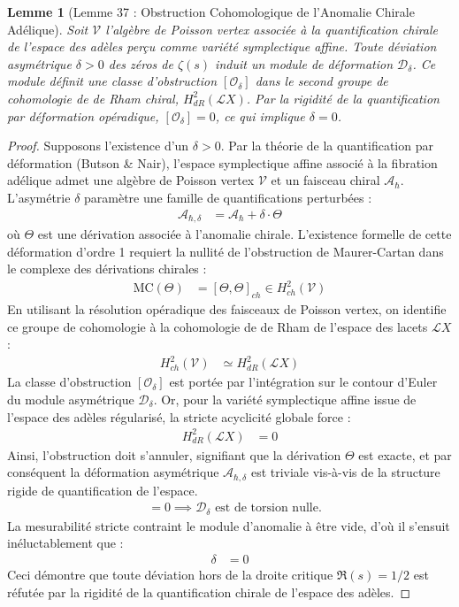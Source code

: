 \documentclass[
]{article}
\newtheorem{lemma}{Lemme}
\begin{document}
\begin{lemma}[Lemme 37 : Obstruction Cohomologique de l'Anomalie Chirale Adélique]
Soit $\mathcal{V}$ l'algèbre de Poisson vertex associée à la quantification chirale de l'espace des adèles perçu comme variété symplectique affine. Toute déviation asymétrique $\delta > 0$ des zéros de $\zeta(s)$ induit un module de déformation $\mathcal{D}_\delta$. Ce module définit une classe d'obstruction $[\mathcal{O}_\delta]$ dans le second groupe de cohomologie de de Rham chiral, $H^2_{dR}(\mathcal{L}X)$. Par la rigidité de la quantification par déformation opéradique, $[\mathcal{O}_\delta] = 0$, ce qui implique $\delta = 0$.
\end{lemma}

\begin{proof}
Supposons l'existence d'un $\delta > 0$. Par la théorie de la quantification par déformation (Butson \& Nair), l'espace symplectique affine associé à la fibration adélique admet une algèbre de Poisson vertex $\mathcal{V}$ et un faisceau chiral $\mathcal{A}_{\hbar}$.
L'asymétrie $\delta$ paramètre une famille de quantifications perturbées :
\begin{align*}
\mathcal{A}_{\hbar,\delta} &= \mathcal{A}_{\hbar} + \delta \cdot \Theta
\end{align*}
où $\Theta$ est une dérivation associée à l'anomalie chirale.
L'existence formelle de cette déformation d'ordre 1 requiert la nullité de l'obstruction de Maurer-Cartan dans le complexe des dérivations chirales :
\begin{align*}
\mathrm{MC}(\Theta) &= [\Theta, \Theta]_{ch} \in H^2_{ch}(\mathcal{V})
\end{align*}
En utilisant la résolution opéradique des faisceaux de Poisson vertex, on identifie ce groupe de cohomologie à la cohomologie de de Rham de l'espace des lacets $\mathcal{L}X$ :
\begin{align*}
H^2_{ch}(\mathcal{V}) &\simeq H^2_{dR}(\mathcal{L}X)
\end{align*}
La classe d'obstruction $[\mathcal{O}_\delta]$ est portée par l'intégration sur le contour d'Euler du module asymétrique $\mathcal{D}_\delta$. Or, pour la variété symplectique affine issue de l'espace des adèles régularisé, la stricte acyclicité globale force :
\begin{align*}
H^2_{dR}(\mathcal{L}X) &= 0
\end{align*}
Ainsi, l'obstruction doit s'annuler, signifiant que la dérivation $\Theta$ est exacte, et par conséquent la déformation asymétrique $\mathcal{A}_{\hbar,\delta}$ est triviale vis-à-vis de la structure rigide de quantification de l'espace.
\begin{align*}
[\mathcal{O}_\delta] &= 0 \implies \mathcal{D}_\delta \text{ est de torsion nulle.}
\end{align*}
La mesurabilité stricte contraint le module d'anomalie à être vide, d'où il s'ensuit inéluctablement que :
\begin{align*}
\delta &= 0
\end{align*}
Ceci démontre que toute déviation hors de la droite critique $\Re(s) = 1/2$ est réfutée par la rigidité de la quantification chirale de l'espace des adèles.
\end{proof}
\end{document}

